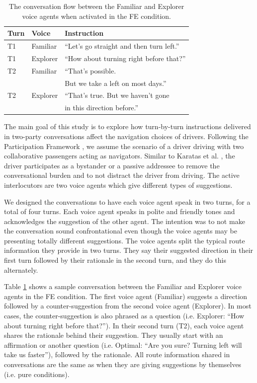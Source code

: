 \begin{table}[h]
    \caption{The conversation flow between the Familiar and Explorer voice agents when activated in the FE condition.}
	\label{tab:sample-convo}
	\centering
	\begin{tabular}{l l l}
	    \hline\hline
		\textbf{Turn} & \textbf{Voice} & \textbf{Instruction} \\
		\hline
		T1 & Familiar & ``Let's go straight and then turn left.'' \\
		T1 & Explorer & ``How about turning right before that?'' \\
		\hline
		T2 & Familiar & ``That's possible.\\ 
		& & But we take a left on most days.'' \\
		T2 & Explorer & ``That's true. But we haven't gone \\
		& & in this direction before.'' \\
		\hline
	\end{tabular}
\end{table}

The main goal of this study is to explore how turn-by-turn instructions delivered in two-party conversations affect the navigation choices of drivers. Following the Participation Framework \cite{Goffman1979-GOFF}, we assume the scenario of a driver driving with two collaborative passengers acting as navigators. Similar to Karatas et al. \cite{Karatas2018}, the driver participates as a bystander or a passive addressee to remove the conversational burden and to not distract the driver from driving. The active interlocutors are two voice agents which give different types of suggestions. 

We designed the conversations to have each voice agent speak in two turns, for a total of four turns. Each voice agent speaks in polite and friendly tones \cite{Yoshiike:2011:MSI:2177868.2177871} and acknowledges the suggestion of the other agent. The intention was to not make the conversation sound confrontational even though the voice agents may be presenting totally different suggestions. The voice agents split the typical route information they provide in two turns. They say their suggested direction in their first turn followed by their rationale in the second turn, and they do this alternately. 

Table \ref{tab:sample-convo} shows a sample conversation between the Familiar and Explorer voice agents in the FE condition. The first voice agent (Familiar) suggests a direction followed by a counter-suggestion from the second voice agent (Explorer). In most cases, the counter-suggestion is also phrased as a question (i.e. Explorer: ``How about turning right before that?''). In their second turn (T2), each voice agent shares the rationale behind their suggestion. They usually start with an affirmation or another question (i.e. Optimal: ``Are you sure? Turning left will take us faster''), followed by the rationale. All route information shared in conversations are the same as when they are giving suggestions by themselves (i.e. pure conditions).  

